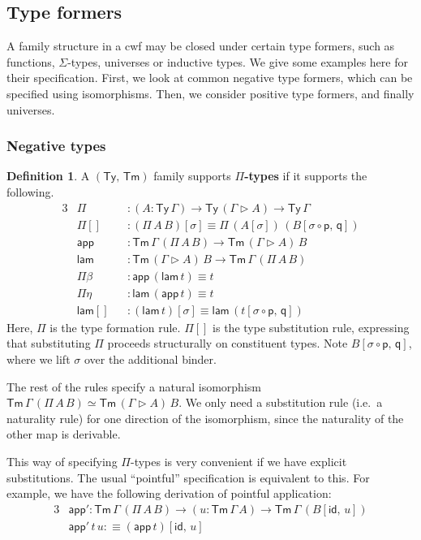 \documentclass[12pt,a4paper,twoside,openany]{book}
\theoremstyle{remark}
\theoremstyle{definition}
\newtheorem{mydefinition}{Definition}
\theoremstyle{theorem}
\newcommand{\ms}[1]{\mathsf{#1}}
\newcommand{\id}{\mathsf{id}}
\newcommand{\Tm}{\mathsf{Tm}}
\newcommand{\Ty}{\mathsf{Ty}}
\newcommand{\ext}{\triangleright}
\newcommand{\p}{\mathsf{p}}
\newcommand{\q}{\mathsf{q}}
\newcommand{\app}{\ms{app}}
\newcommand{\lam}{\ms{lam}}
\newcommand{\defn}{:\equiv}
\begin{document}
\subsection{Type formers}
A family structure in a cwf may be closed under certain type formers, such as
functions, $\Sigma$-types, universes or inductive types. We give some examples
here for their specification. First, we look at common negative type formers,
which can be specified using isomorphisms. Then, we consider positive type
formers, and finally universes.

\subsubsection{Negative types}

\begin{mydefinition}
A $(\Ty,\,\Tm)$ family supports \textbf{$\Pi$-types} if it supports the following.
\begin{alignat*}{3}
  &\Pi           &&: (A : \Ty\,\Gamma) \to \Ty\,(\Gamma\ext A) \to \Ty\,\Gamma\\
  &\ms{\Pi[]}    &&: (\Pi\,A\,B)[\sigma] \equiv \Pi\,(A[\sigma])\,(B[\sigma\circ\p,\,\q])\\
  &\app          &&: \Tm\,\Gamma\,(\Pi\,A\,B) \to \Tm\,(\Gamma \ext A)\,B\\
  &\lam          &&: \Tm\,(\Gamma \ext A)\,B \to \Tm\,\Gamma\,(\Pi\,A\,B)\\
  &\Pi\beta      &&: \app\,(\lam\,t) \equiv t\\
  &\Pi\eta       &&: \lam\,(\app\,t) \equiv t\\
  &\lam[]        &&: (\lam\,t)[\sigma] \equiv \lam\,(t[\sigma\circ\p,\,\q])
\end{alignat*}
Here, $\Pi$ is the type formation rule. $\ms{\Pi[]}$ is the type substitution
rule, expressing that substituting $\Pi$ proceeds structurally on constituent
types.  Note $B[\sigma\circ\p,\,\q]$, where we lift $\sigma$ over the additional
binder.

The rest of the rules specify a natural isomorphism $\Tm\,\Gamma\,(\Pi\,A\,B)
\simeq \Tm\,(\Gamma \ext A)\,B$. We only need a substitution rule (i.e.\ a
naturality rule) for one direction of the isomorphism, since the naturality of
the other map is derivable.

This way of specifying $\Pi$-types is very convenient if we have explicit
substitutions. The usual ``pointful'' specification is equivalent to this. For
example, we have the following derivation of pointful application:
\begin{alignat*}{3}
  &\app' : \Tm\,\Gamma\,(\Pi\,A\,B) \to (u : \Tm\,\Gamma\,A) \to \Tm\,\Gamma\,(B[\id,\,u])\\
  &\app'\,t\,u \defn (\app\,t)[\id,\,u]
\end{alignat*}

\end{mydefinition}
\end{document}
